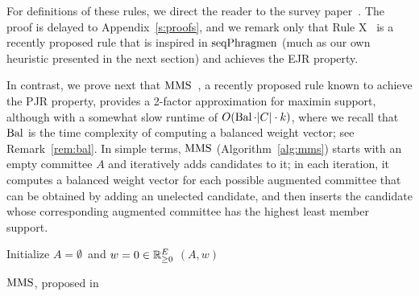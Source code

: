 For definitions of these rules, we direct the reader to the survey paper~\cite{lackner2020approval}.
The proof is delayed to Appendix~\ref{s:proofs}, and we remark only that Rule X~\cite{peters2019proportionality} is a recently proposed rule that is inspired in $\operatorname{seqPhragmen}$ (much as our own heuristic presented in the next section) and achieves the EJR property. 




In contrast, we prove next that $\operatorname{MMS}$~\cite{sanchez2016maximin}, a recently proposed rule known to achieve the PJR property, provides a 2-factor approximation for maximin support, although with a somewhat slow runtime of $O(\operatorname{Bal} \cdot |C|\cdot k)$, where we recall that $\operatorname{Bal}$ is the time complexity of computing a balanced weight vector; see Remark~\ref{rem:bal}. In simple terms, $\operatorname{MMS}$ (Algorithm~\ref{alg:mms}) starts with an empty committee $A$ and iteratively adds candidates to it; in each iteration, it computes a balanced weight vector for each possible augmented committee that can be obtained by adding an unelected candidate, and then inserts the candidate whose corresponding augmented committee has the highest least member support.


\begin{algorithm}[htb]\label{alg:mms}
\SetAlgoLined
{}
Initialize $A=\emptyset$\ and $w=0\in \mathbb{R}_{\geq 0}^E$\;
\Return $(A,w)$\;
\caption{$\operatorname{MMS}$, proposed in~\cite{sanchez2016maximin}}
\end{algorithm}

